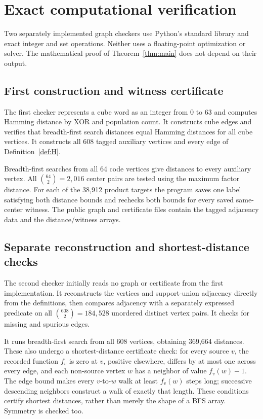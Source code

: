 \documentclass[11pt]{article}
\theoremstyle{definition}
\theoremstyle{remark}
\begin{document}
\section{Exact computational verification}\label{sec:computational}
Two separately implemented graph checkers use Python's standard
library and exact integer and set operations. Neither uses a
floating-point optimization or solver. The mathematical proof
of Theorem~\ref{thm:main} does not depend on their output.

\subsection{First construction and witness certificate}
The first checker represents a cube word as an integer from
0 to 63 and computes Hamming distance by XOR and population
count. It constructs cube edges and verifies that breadth-first
search distances equal Hamming distances for all cube vertices.
It constructs all 608 tagged auxiliary vertices and every edge
of Definition~\ref{def:H}.

Breadth-first searches from all 64 code vertices give distances
to every auxiliary vertex. All \(\binom{64}{2}=2,016\) center
pairs are tested using the maximum factor distance.
For each of the 38,912 product targets the program saves one
label satisfying both distance bounds and rechecks both bounds
for every saved same-center witness. The public graph and
certificate files contain the tagged adjacency data and the
distance/witness arrays.

\subsection{Separate reconstruction and shortest-distance checks}
The second checker initially reads no graph or certificate from
the first implementation. It reconstructs the vertices and
support-union adjacency directly from the definitions, then
compares adjacency with a separately expressed predicate on
all \(\binom{608}{2}=184,528\) unordered distinct vertex pairs.
It checks for missing and spurious edges.

It runs breadth-first search from all 608 vertices, obtaining
369,664 distances. These also undergo a shortest-distance
certificate check: for every source \(v\), the recorded function
\(f_v\) is zero at \(v\), positive elsewhere, differs by at most
one across every edge, and each non-source vertex \(w\) has a
neighbor of value \(f_v(w)-1\). The edge bound makes every
\(v\)-to-\(w\) walk at least \(f_v(w)\) steps long; successive
descending neighbors construct a walk of exactly that length.
These conditions certify shortest distances, rather than merely
the shape of a BFS array. Symmetry is checked too.
\end{document}
